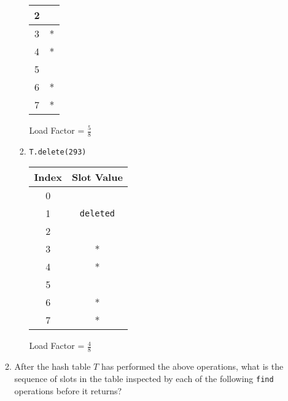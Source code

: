 \documentclass[11pt]{article}
\begin{document}
\begin{enumerate}
\begin{enumerate}
\begin{enumerate}
\begin{center}
\begin{tabular}{|c | c|}
2 & \\
\hline
3 & *\\
\hline
4 & *\\
\hline
5 & \\
\hline
6 & *\\
\hline
7 & *\\
\hline
\end{tabular}
\end{center}
Load Factor = $\frac{5}{8}$
\\
\item
\begin{verbatim}
T.delete(293)
\end{verbatim}
\begin{center}
\begin{tabular}{|c | c|}
\hline
Index & Slot Value\\
\hline
0 & \\
\hline
1 & \texttt{deleted}\\
\hline
2 & \\
\hline
3 & *\\
\hline
4 & *\\
\hline
5 & \\
\hline
6 & *\\
\hline
7 & *\\
\hline
\end{tabular}
\end{center}
Load Factor = $\frac{4}{8}$
\\
\end{enumerate}

\item 
After the hash table $T$ has performed the above operations, what is the
sequence of slots in the table inspected by each of the following
\texttt{find} operations before it returns?

\begin{enumerate}



\end{enumerate}
\end{enumerate}
\end{enumerate}
\end{document}
